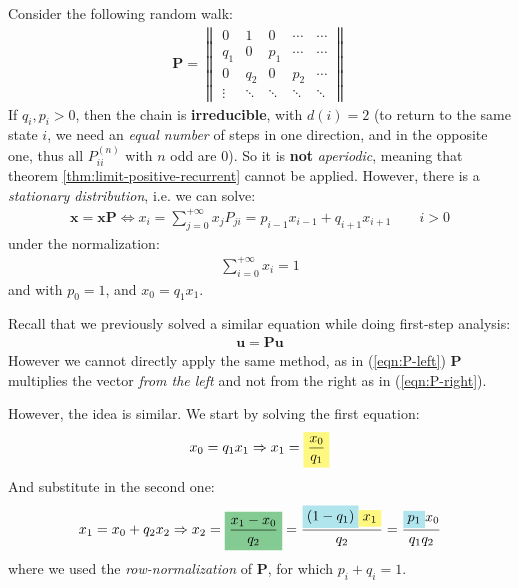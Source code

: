 \documentclass[../template.tex]{subfiles}
\begin{document}
\begin{example}
Consider the following random walk:
\begin{align*}
    \textbf{P} = \begin{Vmatrix}
        0 & 1 & 0 & \cdots & \cdots\\
        q_1 & 0 & p_1 & \cdots & \cdots\\
        0 & q_2 & 0 & p_2 & \cdots \\
        \vdots & \ddots & \ddots & \ddots & \ddots
    \end{Vmatrix} 
\end{align*}
If $q_i, p_i > 0$, then the chain is \textbf{irreducible}, with $d(i) = 2$ (to return to the same state $i$, we need an \textit{equal number} of steps in one direction, and in the opposite one, thus all $P_{i i}^{(n)}$ with $n$ odd are $0$). So it is \textbf{not} \textit{aperiodic}, meaning that theorem \ref{thm:limit-positive-recurrent} cannot be applied. However, there is a \textit{stationary distribution}, i.e. we can solve:
\begin{align}\label{eqn:P-right}
    \bm{x} = \bm{x} \textbf{P} \Leftrightarrow  x_i = \sum_{j=0}^{+\infty} x_j P_{ji} = p_{i-1} x_{i-1} + q_{i+1} x_{i+1} \qquad i > 0
\end{align}  
under the normalization:
\begin{align*}
    \sum_{i=0}^{+\infty} x_i = 1
\end{align*}
and with $p_0 = 1$, and $x_0 = q_1 x_1$.

\medskip

Recall that we previously solved a similar equation while doing first-step analysis: %
\begin{align} \label{eqn:P-left}
    \bm{u} = \textbf{P} \bm{u}  
\end{align}
However we cannot directly apply the same method, as in (\ref{eqn:P-left}) \textbf{P} multiplies the vector \textit{from the left} and not from the right as in (\ref{eqn:P-right}).

\medskip

However, the idea is similar. We start by solving the first equation:
\begin{align*}
    x_0 = q_1 x_1 \Rightarrow x_1 = \hlc{Yellow}{\frac{x_0}{q_1}} 
\end{align*}
And substitute in the second one:
\begin{align} \label{eqn:x-2}
    x_1 = x_0 + q_2 x_2 \Rightarrow x_2 = \hlc{ForestGreen}{\frac{x_1 - x_0}{q_2}} = \frac{\hlc{SkyBlue}{(1-q_1)}\hlc{Yellow}{ x_1}}{q_2} = \frac{\hlc{SkyBlue}{p_1} x_0}{q_1 q_2} 
\end{align}
where we used the \textit{row-normalization} of \textbf{P}, for which $p_i + q_i = 1$.


\end{example}
\end{document}
